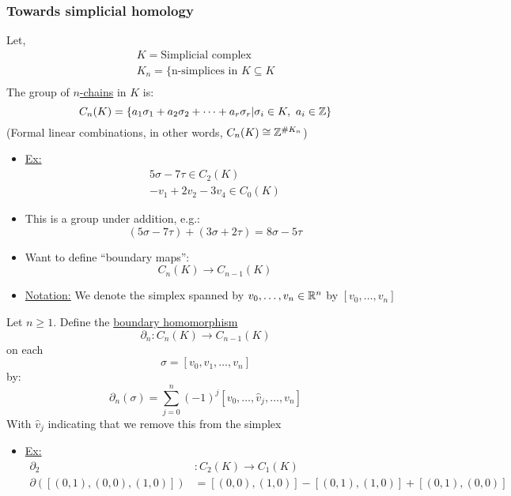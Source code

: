 \documentclass[../notes.tex]{subfiles}
\begin{document}
\subsubsection{Towards simplicial homology}
\begin{definition}
Let,
\begin{align*}
    K=\text{Simplicial complex}\\
    K_n=\{\text{n-simplices in $K$}\subseteq K\\
\end{align*}
The group of \underline{$n$-chains} in $K$ is:
\[
    C_n(K)=\{a_1\sigma_1+a_2\sigma_2+\cdots+a_r\sigma_r| \sigma_i\in K,\ a_i\in \mathbb{Z}\}
\]
(Formal linear combinations, in other words, $C_n(K)\cong \mathbb{Z}^{\#K_n}$)
\end{definition}
\begin{itemize}
    \item \underline{Ex:}
        \begin{align*}
            5\sigma-7\tau\in C_2(K)\\
            -v_1+2v_2-3v_4\in C_0(K)
        \end{align*}
    \item This is a group under addition, e.g.:
        \[
            (5\sigma-7\tau)+(3\sigma+2\tau)=8\sigma-5\tau
        \]
    \item Want to define ``boundary maps'':
        \[
            C_n(K)\rightarrow C_{n-1}(K)
        \]
    \item \underline{Notation:} We denote the simplex spanned by $v_0,\dots,v_n\in\mathbb{R}^n$
        by $[v_0,\dots,v_n]$
\end{itemize}
\begin{definition}
    Let $n\geq 1$. Define the \underline{boundary homomorphism}
    \[
        \partial_n:C_n(K)\rightarrow C_{n-1}(K)
    \]
    on each
    \[
        \sigma = [v_0,v_1,\dots,v_n]
    \]
    by:
    \[
        \partial_n(\sigma)=\sum_{j=0}^{n}(-1)^j[v_0,\dots,\hat{v}_j,\dots,v_n]
    \]
    With $\hat{v}_j$ indicating that we remove this from the simplex
\end{definition}
\newpage
\begin{itemize}
    \item \underline{Ex:}
        \begin{align*}
            \partial_2&:C_2(K)\rightarrow C_1(K)\\
            \partial([(0,1),(0,0),(1,0)])&=[(0,0),(1,0)]-[(0,1),(1,0)]+[(0,1),(0,0)]
        \end{align*}
\end{itemize}
\end{document}
